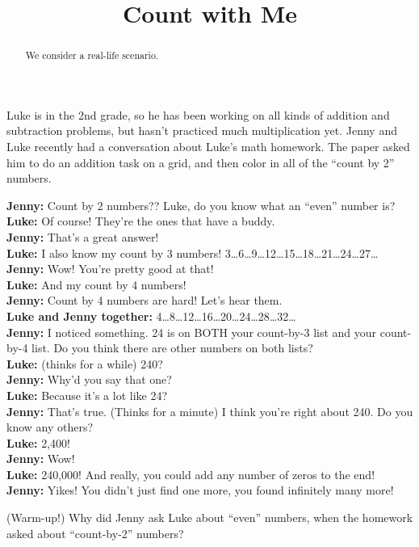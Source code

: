 \documentclass{ximera}
\title{Count with Me}
\begin{document}
\begin{abstract} We consider a real-life scenario. \end{abstract}
\maketitle

Luke is in the 2nd grade, so he has been working on all kinds of addition and subtraction problems, but hasn't practiced much multiplication yet. Jenny and Luke recently had a conversation about Luke’s math homework. The paper asked him to do an addition task on a grid, and then color in all of the ``count by 2'' numbers.

{\bf Jenny:} Count by 2 numbers?? Luke, do you know what an ``even'' number is?\\
{\bf Luke:} Of course! They’re the ones that have a buddy.\\
{\bf Jenny:} That’s a great answer!\\
{\bf Luke:} I also know my count by 3 numbers! 3…6…9…12…15…18…21…24…27…\\
{\bf Jenny:} Wow! You’re pretty good at that!\\
{\bf Luke:} And my count by 4 numbers!\\
{\bf Jenny:} Count by 4 numbers are hard! Let’s hear them.\\
{\bf Luke and Jenny together:} 4…8…12…16…20…24…28…32…\\
{\bf Jenny:} I noticed something. 24 is on BOTH your count-by-3 list and your count-by-4 list. Do you think there are other numbers on both lists?\\
{\bf Luke:} (thinks for a while) 240?\\
{\bf Jenny:} Why’d you say that one?\\
{\bf Luke:} Because it’s a lot like 24?\\
{\bf Jenny:} That’s true. (Thinks for a minute) I think you’re right about 240. Do you know any others?\\
{\bf Luke:} 2,400! \\
{\bf Jenny:} Wow!\\
{\bf Luke:} 240,000! And really, you could add any number of zeros to the end!\\
{\bf Jenny:} Yikes! You didn’t just find one more, you found infinitely many more!\\


\begin{problem} (Warm-up!) Why did Jenny ask Luke about ``even'' numbers, when the homework asked about ``count-by-2'' numbers?
\end{problem}
\end{document}
